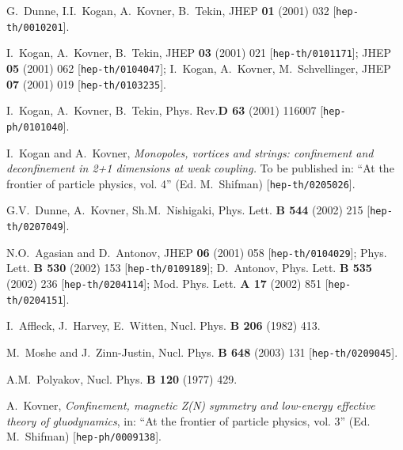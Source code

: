 \documentclass[a4paper,12pt]{article}
\begin{document}
\newpage


\begin{thebibliography}{100}

G.~Dunne, I.I.~Kogan, A.~Kovner, B.~Tekin, JHEP {\bf 01} (2001) 032 [{\tt hep-th/0010201}].


 I.~Kogan, A.~Kovner, B.~Tekin, JHEP {\bf 03} (2001) 021
[{\tt hep-th/0101171}]; JHEP {\bf 05} (2001) 062 [{\tt hep-th/0104047}];
I.~Kogan, A.~Kovner, M.~Schvellinger,  JHEP {\bf 07} (2001) 019 [{\tt hep-th/0103235}].



 I.~Kogan, A.~Kovner, B.~Tekin,
Phys. Rev.{\bf D 63} (2001) 116007 [{\tt hep-ph/0101040}].

 I.~Kogan and A.~Kovner, {\it Monopoles, vortices and strings:
confinement and deconfinement in 2+1 dimensions at weak coupling.}
To be published in: ``At the frontier of
particle physics, vol. 4'' (Ed. M.~Shifman) [{\tt hep-th/0205026}].

 G.V.~Dunne, A.~Kovner, Sh.M.~Nishigaki,
Phys. Lett. {\bf B 544} (2002) 215
[{\tt hep-th/0207049}].


 N.O.~Agasian and D.~Antonov, JHEP {\bf 06} (2001) 058 [{\tt hep-th/0104029}];
Phys. Lett. {\bf B 530} (2002) 153 [{\tt hep-th/0109189}]; D.~Antonov,
Phys. Lett. {\bf B 535} (2002) 236 [{\tt hep-th/0204114}];
Mod. Phys. Lett. {\bf A 17} (2002) 851 [{\tt hep-th/0204151}].


I.~Affleck, J.~Harvey, E.~Witten, Nucl. Phys. {\bf B 206} (1982) 413.

M.~Moshe and J.~Zinn-Justin,
Nucl. Phys. {\bf B 648} (2003) 131
[{\tt hep-th/0209045}].


A.M.~Polyakov, Nucl. Phys. {\bf B 120} (1977) 429.

 A.~Kovner, {\it Confinement, magnetic Z(N) symmetry and low-energy effective theory of gluodynamics},
in: ``At the frontier of
particle physics, vol. 3'' (Ed. M.~Shifman) [{\tt hep-ph/0009138}].


\end{thebibliography}
\end{document}
